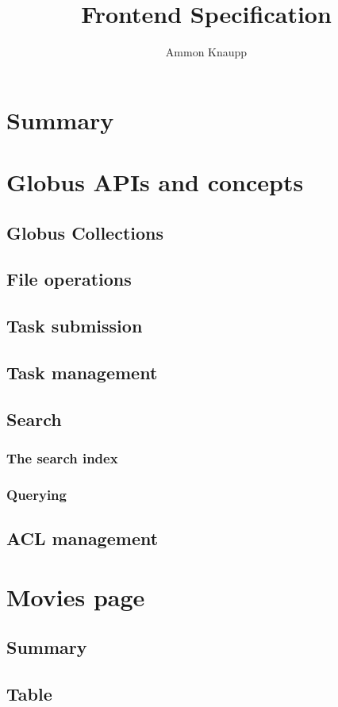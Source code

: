 \documentclass{report}
\author{Ammon Knaupp}
\title{Frontend Specification}
\begin{document}
\maketitle
\tableofcontents

\chapter{Summary}


\chapter{Globus APIs and concepts}
\section{Globus Collections}
\section{File operations}
\section{Task submission}
\section{Task management}
\section{Search}
\subsection{The search index}
\subsection{Querying}
\section{ACL management}

\chapter{Movies page}
\section{Summary}
\section{Table}
\end{document}
